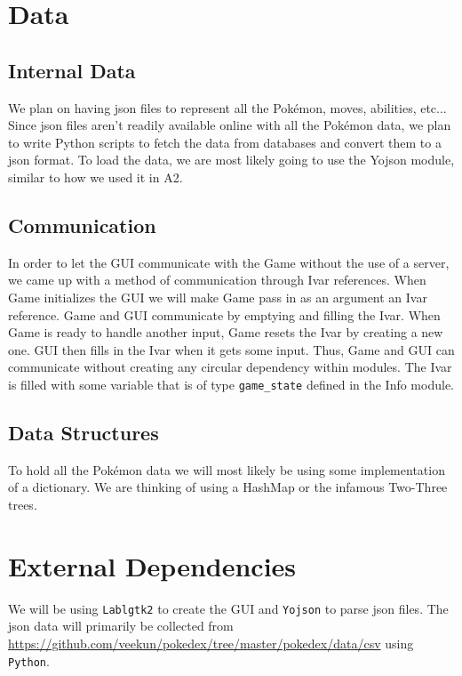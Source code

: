 \documentclass{scrreprt}
\begin{document}
\section{Data}
\subsection{Internal Data}
We plan on having json files to represent all the Pok\'emon, moves, abilities, etc... Since json files aren't readily available online with all the Pok\'emon data, we plan to write Python scripts to fetch the data from databases and convert them to a json format. To load the data, we are most likely going to use the Yojson module, similar to how we used it in A2. 

\subsection{Communication}
In order to let the GUI communicate with the Game without the use of a server, we came up with a method of communication through Ivar references. When Game initializes the GUI we will make Game pass in as an argument an Ivar reference. Game and GUI communicate by emptying and filling the Ivar. When Game is ready to handle another input, Game resets the Ivar by creating a new one. GUI then fills in the Ivar when it gets some input. Thus, Game and GUI can communicate without creating any circular dependency within modules. The Ivar is filled with some variable that is of type \texttt{game\_state} defined in the Info module. 

\subsection{Data Structures}
To hold all the Pok\'emon data we will most likely be using some implementation of a dictionary. We are thinking of using a HashMap or the infamous Two-Three trees.

\section{External Dependencies}
We will be using \texttt{Lablgtk2} to create the GUI and \texttt{Yojson} to parse json files. The json data
will primarily be collected from \url{https://github.com/veekun/pokedex/tree/master/pokedex/data/csv} using \texttt{Python}.
\end{document}
